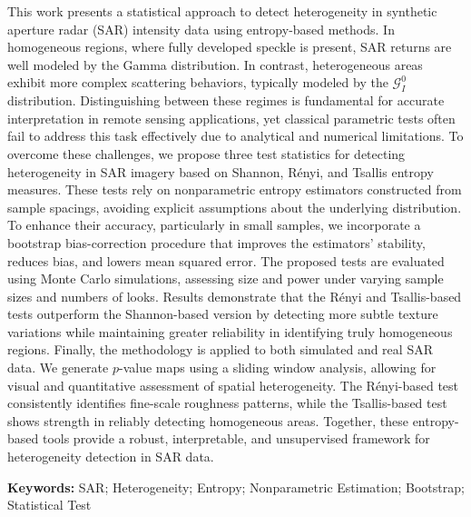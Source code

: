 
This work  presents a statistical approach to detect heterogeneity 
in synthetic aperture radar (SAR) intensity data using entropy-based methods.
In homogeneous regions, where fully developed speckle is present, SAR returns 
are well modeled by the Gamma distribution. 
In contrast, heterogeneous areas exhibit more complex scattering behaviors, 
typically modeled by the $\mathcal{G}_I^0$ distribution. Distinguishing between 
these regimes is fundamental for accurate interpretation in remote sensing applications, 
yet classical parametric tests often fail to address this task effectively due to analytical 
and numerical limitations.
To overcome these challenges, we propose three test statistics for detecting heterogeneity 
in SAR imagery based on Shannon, Rényi, and Tsallis entropy measures. These tests rely on 
nonparametric entropy estimators constructed from sample spacings, avoiding explicit assumptions 
about the underlying distribution. To enhance their accuracy, particularly in small samples, 
we incorporate a bootstrap bias-correction procedure that improves the estimators’ stability, 
reduces bias, and lowers mean squared error.
The proposed tests are evaluated using Monte Carlo simulations, assessing size and power 
under varying sample sizes and numbers of looks.
Results demonstrate that the Rényi and Tsallis-based tests outperform the Shannon-based version by 
detecting more subtle texture variations while maintaining greater reliability in identifying 
truly homogeneous regions.
Finally, the methodology is applied to both simulated and real SAR data. We generate $p$-value maps using a 
sliding window analysis, allowing for visual and quantitative assessment of spatial heterogeneity. 
The Rényi-based test consistently identifies fine-scale roughness patterns, 
while the Tsallis-based test shows strength in reliably detecting homogeneous areas. 
Together, these entropy-based tools provide a robust, interpretable, and unsupervised 
framework for heterogeneity detection in SAR data.

\vspace{1em}
\par
\noindent \textbf{Keywords:} SAR; Heterogeneity; Entropy; Nonparametric Estimation; Bootstrap; Statistical Test





